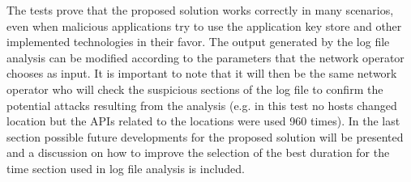 {The tests prove that the proposed solution works correctly in many scenarios, even when malicious applications try to use the application key store and other implemented technologies in their favor. The output generated by the log file analysis can be modified according to the parameters that the network operator chooses as input. It is important to note that it will then be the same network operator who will check the suspicious sections of the log file to confirm the potential attacks resulting from the analysis (e.g. in this test no hosts changed location but the APIs related to the locations were used 960 times). In the last section possible future developments for the proposed solution will be presented and a discussion on how to improve the selection of the best duration for the time section used in log file analysis is included.

\clearpage

}
